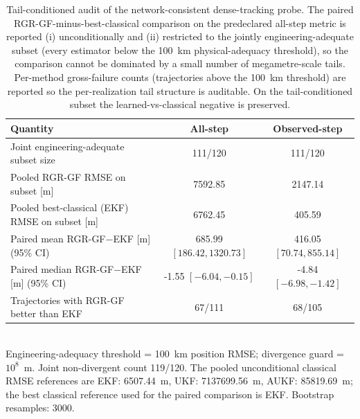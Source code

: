 \begin{table}[t]
  \centering
  \caption{Tail-conditioned audit of the network-consistent dense-tracking probe. The paired RGR-GF-minus-best-classical comparison on the predeclared all-step metric is reported (i) unconditionally and (ii) restricted to the jointly engineering-adequate subset (every estimator below the 100~km physical-adequacy threshold), so the comparison cannot be dominated by a small number of megametre-scale tails. Per-method gross-failure counts (trajectories above the 100~km threshold) are reported so the per-realization tail structure is auditable. On the tail-conditioned subset the learned-vs-classical negative is preserved.}
  \label{tab:dense_tracking_tail_audit}

  \vspace{4pt}
  \begin{tabular}{lcc}
    \toprule
    Quantity & All-step & Observed-step \\
    \midrule
    Joint engineering-adequate subset size & 111/120 & 111/120 \\
    Pooled RGR-GF RMSE on subset [m] & 7592.85 & 2147.14 \\
    Pooled best-classical (EKF) RMSE on subset [m] & 6762.45 & 405.59 \\
    Paired mean RGR-GF$-$EKF [m] (95\% CI) & 685.99 $[186.42, 1320.73]$ & 416.05 $[70.74, 855.14]$ \\
    Paired median RGR-GF$-$EKF [m] (95\% CI) & -1.55 $[-6.04, -0.15]$ & -4.84 $[-6.98, -1.42]$ \\
    Trajectories with RGR-GF better than EKF & 67/111 & 68/105 \\
    \bottomrule
  \end{tabular}
  \\[2pt] {\footnotesize Engineering-adequacy threshold = 100~km position RMSE; divergence guard = $10^{8}$~m. Joint non-divergent count 119/120. The pooled unconditional classical RMSE references are EKF: 6507.44~m, UKF: 7137699.56~m, AUKF: 85819.69~m; the best classical reference used for the paired comparison is EKF. Bootstrap resamples: 3000.}
\end{table}